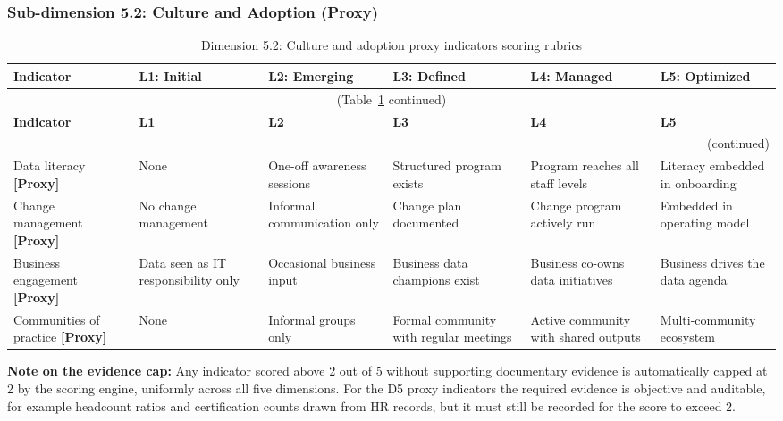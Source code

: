 \subsubsection*{Sub-dimension 5.2: Culture and Adoption (Proxy)}

\begin{center}
{\small
\begin{longtable}{|p{2.4cm}|p{2.0cm}|p{2.0cm}|p{2.2cm}|p{2.2cm}|p{2.2cm}|}
\caption{Dimension 5.2: Culture and adoption proxy indicators scoring rubrics}\label{tab:d5-2}\\

\hline
\textbf{Indicator} & \textbf{L1: Initial} & \textbf{L2: Emerging} & \textbf{L3: Defined} & \textbf{L4: Managed} & \textbf{L5: Optimized} \\
\hline
\endfirsthead
\multicolumn{6}{c}{\small (Table~\ref{tab:d5-2} continued)} \\
\hline
\textbf{Indicator} & \textbf{L1} & \textbf{L2} & \textbf{L3} & \textbf{L4} & \textbf{L5} \\
\hline
\endhead
\hline
\multicolumn{6}{r}{\small (continued)} \\
\endfoot
\hline
\endlastfoot
Data literacy \textbf{[Proxy]} &
  None &
  One-off awareness sessions &
  Structured program exists &
  Program reaches all staff levels &
  Literacy embedded in onboarding \\
\hline
Change management \textbf{[Proxy]} &
  No change management &
  Informal communication only &
  Change plan documented &
  Change program actively run &
  Embedded in operating model \\
\hline
Business engagement \textbf{[Proxy]} &
  Data seen as IT responsibility only &
  Occasional business input &
  Business data champions exist &
  Business co-owns data initiatives &
  Business drives the data agenda \\
\hline
Communities of practice \textbf{[Proxy]} &
  None &
  Informal groups only &
  Formal community with regular meetings &
  Active community with shared outputs &
  Multi-community ecosystem \\
\hline
\end{longtable}
}
\end{center}

\vspace{1em}
\noindent \textbf{Note on the evidence cap:} Any indicator scored above 2 out of 5 without supporting documentary evidence is automatically capped at 2 by the scoring engine, uniformly across all five dimensions. For the D5 proxy indicators the required evidence is objective and auditable, for example headcount ratios and certification counts drawn from HR records, but it must still be recorded for the score to exceed 2.

